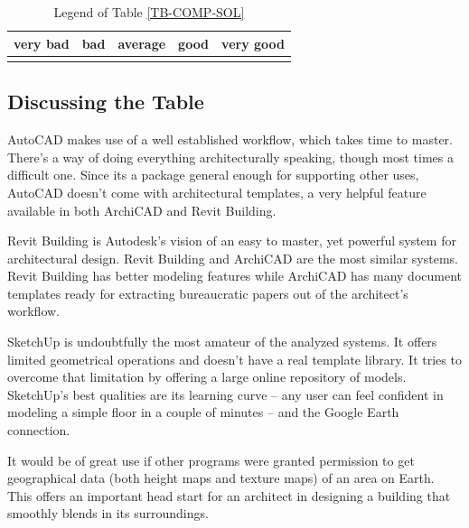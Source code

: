 \begin{table}[!ht]
  \centering
  \caption{Legend of Table \ref{TB-COMP-SOL}}
	\begin{tabular}{|p{2cm}|p{2cm}|p{2cm}|p{2cm}|p{2cm}|}
		\hline
		very bad	& bad			& average	& good		& very good	\\
		\hline
			\GdE		&	\GdD		&	\GdC		&	\GdB		&	\GdA			\\
		\hline
	\end{tabular}
  \label{TB-COMP-SOL-LEGEND}
\end{table}

\subsection{Discussing the Table}
AutoCAD makes use of a well established workflow, which takes time to master.
There's a way of doing everything architecturally speaking, though most times a difficult one.
Since its a package general enough for supporting other uses, AutoCAD doesn't come with architectural
templates, a very helpful feature available in both ArchiCAD and Revit Building.

Revit Building is Autodesk's vision of an easy to master, yet powerful system for architectural design.
Revit Building and ArchiCAD are the most similar systems.
Revit Building has better modeling features while ArchiCAD has many document templates
ready for extracting bureaucratic papers out of the architect's workflow.

SketchUp is undoubtfully the most amateur of the analyzed systems.
It offers limited geometrical operations and doesn't have a real template library.
It tries to overcome that limitation by offering a large online repository of models.
SketchUp's best qualities are its learning curve -- any user can feel confident in
modeling a simple floor in a couple of minutes -- and the Google Earth connection.

It would be of great use if other programs were granted permission to get geographical
data (both height maps and texture maps) of an area on Earth.
This offers an important head start for an architect in designing a building that
smoothly blends in its surroundings.
